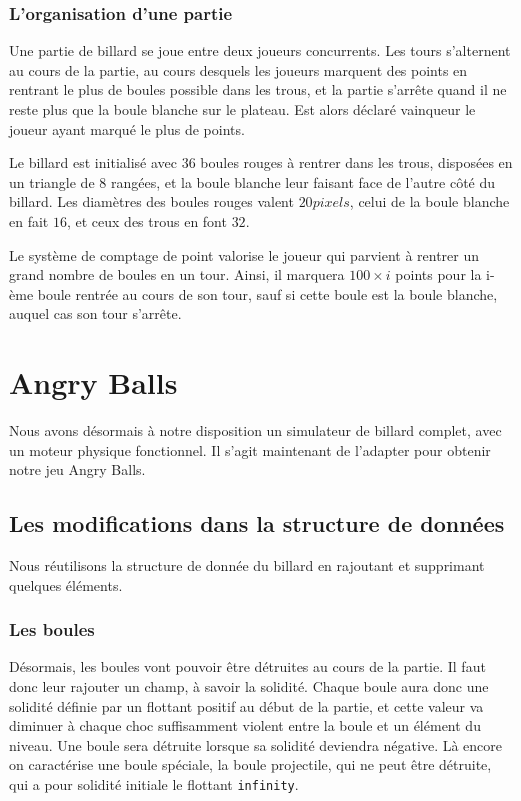 \documentclass[a4paper,11pt]{article}
\begin{document}
\subsubsection{L'organisation d'une partie}
Une partie de billard se joue entre deux joueurs concurrents. Les tours s'alternent au cours de la partie, au
cours desquels les joueurs marquent des points en rentrant le plus de boules possible dans les trous, et la
partie s'arrête quand il ne reste plus que la boule blanche sur le plateau. Est alors déclaré vainqueur le 
joueur ayant marqué le plus de points.

Le billard est initialisé avec 36 boules rouges à rentrer dans les trous, disposées en un triangle de 8 rangées,
et la boule blanche leur faisant face de l'autre côté du billard. Les diamètres des boules rouges valent $20 pixels$, 
celui de la boule blanche en fait $16$, et ceux des trous en font $32$.

Le système de comptage de point valorise le joueur qui parvient à rentrer un grand nombre de boules en un tour.
Ainsi, il marquera $100 \times i$ points pour la i-ème boule rentrée au cours de son tour, sauf si cette boule
est la boule blanche, auquel cas son tour s'arrête.

\section{Angry Balls}
Nous avons désormais à notre disposition un simulateur de billard complet, avec un moteur physique fonctionnel.
Il s'agit maintenant de l'adapter pour obtenir notre jeu Angry Balls.

\subsection{Les modifications dans la structure de données}
Nous réutilisons la structure de donnée du billard en rajoutant et supprimant quelques éléments.

\subsubsection{Les boules}
Désormais, les boules vont pouvoir être détruites au cours de la partie. Il faut donc leur rajouter un champ, 
à savoir la solidité. Chaque boule aura donc une solidité définie par un flottant positif au début de la partie,
et cette valeur va diminuer à chaque choc suffisamment violent entre la boule et un élément du niveau. Une
boule sera détruite lorsque sa solidité deviendra négative. Là encore on caractérise une boule spéciale, la boule
projectile, qui ne peut être détruite, qui a pour solidité initiale le flottant \texttt{infinity}.
\end{document}
